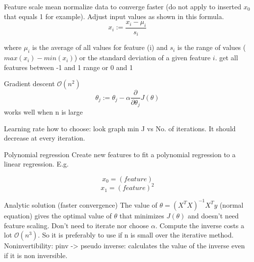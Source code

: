 \documentclass[12pt,a4paper]{report}
\begin{document}
Feature scale
	mean normalize data to converge faster (do not apply to inserted $ x_{0} $ that equals 1 for example). Adjust input values as shown in this formula.
	\begin{equation}
	x_{i} := \frac{x_{i}-\mu_{i}}{s_{i}}
	\end{equation}
	
	where $ \mu_{i} $ is the average of all values for feature (i) and $ s_{i} $ is the range of values ($ max(x_{i})-min(x_{i}) $) or the standard deviation of a given feature $ i $.
	get all features between -1 and 1 range or 0 and 1
	
Gradient descent $\mathcal{O}(n^{2})$
	\begin{equation}
	\theta_{j} := \theta_{j} - \alpha \frac{\partial}{\partial \theta_{j}}J(\theta)
	\end{equation}
	works well when n is large
	
Learning rate
	how to choose: look graph min J vs No. of iterations. It should decrease at every iteration.

Polynomial regression
	Create new features to fit a polynomial regression to a linear regression.
	E.g.
	
	\begin{equation}
	x_{0} = (feature)
	\end{equation}
	\begin{equation}
	x_{1} = (feature)^{2}
	\end{equation}
	
	
Analytic solution (faster convergence)
	The value of $ \theta = (X^{T}X)^{-1}X^{T}y $ (normal equation) gives the optimal value of $\theta$ that minimizes $ J(\theta) $ and doesn't need feature scaling.
	Don't need to iterate nor choose $\alpha$.
	Compute the inverse costs a lot $\mathcal{O}(n^{3})$. So it is preferably to use if n is small over the iterative method.
	Noninvertibility: pinv -> pseudo inverse: calculates the value of the inverse even if it is non inversible. 
	
\end{document}
